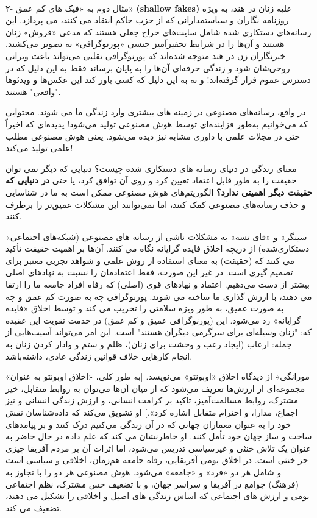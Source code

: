 \documentclass[12pt,oneside]{book}
\begin{document}
    \paragraph{}
    ۲- مثال دوم به «فیک های کم عمق» \textenglish{\textbf{(shallow fakes)}} علیه زنان در هند، به ویژه روزنامه نگاران و سیاستمدارانی که از حزب حاکم انتقاد می کنند، می پردازد.
    این رسانه‌های دستکاری شده شامل سایت‌های حراج جعلی هستند که مدعی «فروش» زنان هستند و آن‌ها را در شرایط تحقیرآمیز جنسی «پورنوگرافی» به تصویر می‌کشند.
    خبرنگاران زن در هند متوجه شده‌اند که پورنوگرافی تقلبی می‌تواند باعث ویرانی روحی‌شان شود و زندگی حرفه‌ای آن‌ها را به پایان برساند فقط به این دلیل که در دسترس عموم قرار گرفته‌اند!
    و نه به این دلیل که کسی باور کند این عکس‌ها و ویدئوها "واقعی" هستند.

    در واقع، رسانه‌های مصنوعی در زمینه های بیشتری وارد زندگی ما می شوند.
    محتوایی که می‌خوانیم به‌طور فزاینده‌ای توسط هوش مصنوعی تولید می‌شود!
    پدیده‌ای که اخیراً حتی در مجلات علمی با داوری مشابه نیز دیده می‌شود.
    یعنی هوش مصنوعی مطلب علمی تولید می‌کند!

    معنای زندگی در دنیای رسانه های دستکاری شده چیست؟ دنیایی که دیگر نمی توان حقیقت را به طور قابل اعتماد تعیین کرد و روی آن توافق کرد، یا حتی  \textbf{در دنیایی که حقیقت دیگر اهمیتی ندارد؟}
    الگوریتم‌های هوش مصنوعی ممکن است به ما در شناسایی و حذف رسانه‌های مصنوعی کمک کنند، اما نمی‌توانند این مشکلات عمیق‌تر را برطرف کنند.

    «سینگر» و «فای تسه» به مشکلات ناشی از رسانه های مصنوعی (شبکه‌های اجتماعی دستکاری‌شده) از دریچه اخلاق فایده گرایانه نگاه می کنند.
    آن‌ها بر اهمیت حقیقت تأکید می کنند که (حقیقت) به معنای استفاده از روش علمی و شواهد تجربی معتبر برای تصمیم گیری است.
    در غیر این صورت، فقط اعتمادمان را نسبت به نهاد‌های اصلی بیشتر از دست می‌دهیم.
    اعتماد و نهادهای قوی (اصلی) که رفاه افراد جامعه ما را ارتقا می دهند، با ارزش گذاری ما ساخته می شوند.
    پورنوگرافی چه به صورت کم عمق و چه به صورت عمیق، به طور ویژه سلامتی را تخریب می کند و توسط اخلاق «فایده گرایانه» رد می‌شود.
    این (پورنوگرافی عمیق و کم عمق) در خدمت تقویت این عقیده که: "زنان وسیله‌ای برای سرگرمی دیگران هستند" است.
    این امر می‌تواند آسیب‌هایی از جمله: ارعاب (ایجاد رعب و وحشت برای زنان)، ظلم و ستم و وادار کردن زنان به انجام کارهایی خلاف قوانین زندگی عادی، داشته‌باشد.

    «مورانگی» از دیدگاه اخلاق «اوبونتو» می‌نویسد.
    [به طور کلی، «اخلاق اوبونتو به عنوان مجموعه‌ای از ارزش‌ها تعریف می‌شود که از میان آن‌ها می‌توان به روابط متقابل، خیر مشترک، روابط مسالمت‌آمیز، تأکید بر کرامت انسانی، و ارزش زندگی انسانی و نیز اجماع، مدارا، و احترام متقابل اشاره کرد».]
    او تشویق می‌کند که داده‌شناسان نقش خود را به عنوان معماران جهانی که در آن زندگی می‌کنیم درک کنند و بر پیامدهای ساخت و ساز جهان خود تأمل کنند.
    او خاطرنشان می کند که علم داده در حال حاضر به عنوان یک تلاش خنثی و غیرسیاسی تدریس می‌شود، اما اثرات آن بر مردم آفریقا چیزی جز خنثی است.
    در اخلاق بومی آفریقایی، رفاه جامعه هم‌زمان، اخلاقی و سیاسی است و شامل هر دو «فرد» و «جامعه» می‌شود.
    هوش مصنوعی هر دو را با تجاوز به (فرهنگ) جوامع در آفریقا و سراسر جهان، و با تضعیف حس مشترک، نظم اجتماعی بومی و ارزش های اجتماعی که اساس زندگی های اصیل و اخلاقی را تشکیل می دهند، تضعیف می کند.
\end{document}

